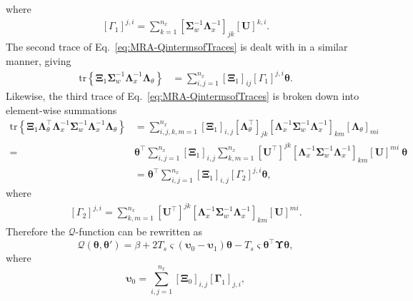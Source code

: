 \documentclass[review,authoryear,3p]{elsarticle}
\begin{document}
where
\begin{align}
\left[ \Gamma_1\right]^{j,i} =\sum_{k=1}^{n_x}\left[ \boldsymbol\Sigma_w^{-1}\boldsymbol\Lambda_x^{-1}\right]_{jk} \left[ \mathbf U\right]^{k,i}.
\end{align}
The second trace of Eq.~\eqref{eq:MRA-QintermsofTraces} is dealt with in a similar manner, giving
\begin{align}
\mathrm{tr} \left\lbrace \boldsymbol \Xi_1\boldsymbol\Sigma_w^{-1}\boldsymbol\Lambda_x^{-1}\boldsymbol\Lambda_{\theta}\right\rbrace&=
\sum_{i,j=1}^{n_x}\left[ \boldsymbol\Xi_1\right]_{ij}\left[ \Gamma_1\right] ^{j,i}\boldsymbol\theta.
\end{align}
Likewise, the third trace of Eq.~\eqref{eq:MRA-QintermsofTraces} is broken down into element-wise summations
\begin{align}
\mathrm{tr} \left\lbrace \boldsymbol\Xi_1 \boldsymbol\Lambda_{\theta}^\top\boldsymbol\Lambda_x^{-1}\boldsymbol\Sigma_w^{-1}\boldsymbol\Lambda_x^{-1}\boldsymbol\Lambda_{\theta}\right\rbrace&=\sum_{i,j,k,m=1}^{n_x}\left[\boldsymbol\Xi_1\right] _{i,j}[\boldsymbol\Lambda_{\theta}^{\top}]_{jk} \left[\boldsymbol\Lambda_x^{-1}\boldsymbol\Sigma_w^{-1}\boldsymbol\Lambda_x^{-1} \right]_{km}[\boldsymbol\Lambda_{\theta}]_{mi} \nonumber \\
=&\boldsymbol\theta^\top\sum_{i,j=1}^{n_x}\left[\boldsymbol\Xi_1\right] _{i,j}\sum_{k,m=1}^{n_x}[\mathbf U^{\top}]^{jk} \left[\boldsymbol\Lambda_x^{-1}\boldsymbol\Sigma_w^{-1}\boldsymbol\Lambda_x^{-1} \right]_{km}[\mathbf U]^{mi}~\boldsymbol\theta \nonumber \\
&=\boldsymbol\theta^\top\sum_{i,j=1}^{n_x}\left[\boldsymbol\Xi_1\right] _{i,j}\left[ \Gamma_2\right] ^{j,i}\boldsymbol\theta,
\end{align}
where
\begin{align}
\left[ \Gamma_2\right] ^{j,i}=\sum_{k,m=1}^{n_x}[\mathbf U^{\top}]^{jk} \left[\boldsymbol\Lambda_x^{-1}\boldsymbol\Sigma_w^{-1}\boldsymbol\Lambda_x^{-1} \right]_{km}[\mathbf U]^{mi}.
\end{align}
Therefore the $\mathcal Q$-function can be rewritten as
\begin{equation}\label{eq:MRA-QCompact}
\mathcal Q\left(\boldsymbol \theta,\boldsymbol\theta'\right)=\beta+2T_s\varsigma\left(\boldsymbol\upsilon_0-\boldsymbol\upsilon_1\right)\boldsymbol\theta-T_s\varsigma\boldsymbol\theta^\top\boldsymbol\Upsilon\boldsymbol\theta,
\end{equation}
where
\begin{equation}\label{eq:epsilon0}
\boldsymbol\upsilon_0=\sum_{i,j=1}^{n_x}[\boldsymbol\Xi_0]_{i,j}[\boldsymbol\Gamma_1]_{j,i},
\end{equation}
\end{document}
